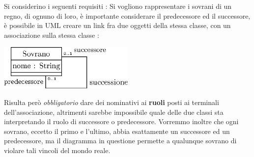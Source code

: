 \documentclass[12pt, letterpaper]{article}
\begin{document}
Si considerino i seguenti requisiti : Si vogliono rappresentare i sovrani
di un regno, di ognuno di loro, è importante considerare il predecessore
ed il successore, è possibile in UML creare un link fra due oggetti della
stessa classe, con un associazione sulla stessa classe : \begin{center}
    \includegraphics[width=0.5\textwidth ]{images/sovrani.eps}
\end{center}
Risulta però \textit{obbligatorio} dare dei nominativi ai \textbf{ruoli}
posti ai terminali dell'associazione, altrimenti sarebbe impossibile quale
delle due classi sta interpretando il ruolo di successore o predecessore.
Vorremmo inoltre che ogni sovrano, eccetto il primo e l'ultimo, abbia esattamente
un successore ed un predecessore, ma il diagramma in questione permette a qualunque
sovrano di violare tali vincoli del mondo reale.
\end{document}
